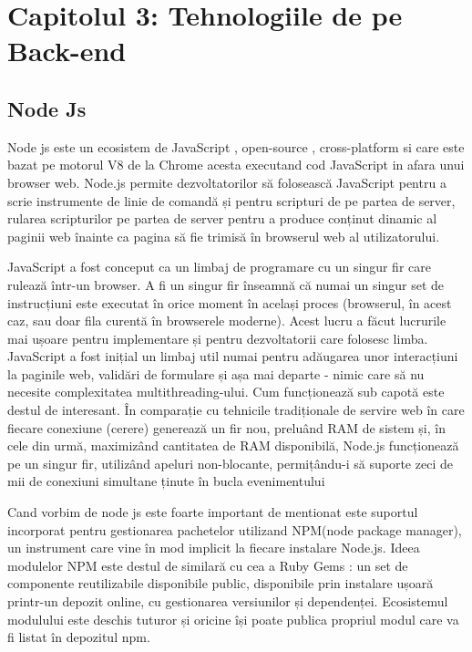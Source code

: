 \chapter{Capitolul 3: Tehnologiile de pe Back-end}
\label{chap:ch3}

\section{Node Js}
\label{sec:ch3sec1}

\par Node js este un ecosistem de JavaScript , open-source , cross-platform si care este bazat pe motorul V8 de la Chrome acesta executand cod JavaScript in afara unui browser web. Node.js permite dezvoltatorilor să folosească JavaScript pentru a scrie instrumente de linie de comandă și pentru scripturi de pe partea de server, rularea scripturilor pe partea de server pentru a produce conținut dinamic al paginii web înainte ca pagina să fie trimisă în browserul web al utilizatorului.
\par JavaScript a fost conceput ca un limbaj de programare cu un singur fir care rulează într-un browser. A fi un singur fir înseamnă că numai un singur set de instrucțiuni este executat în orice moment în același proces (browserul, în acest caz, sau doar fila curentă în browserele moderne).
Acest lucru a făcut lucrurile mai ușoare pentru implementare și pentru dezvoltatorii care folosesc limba. JavaScript a fost inițial un limbaj util numai pentru adăugarea unor interacțiuni la paginile web, validări de formulare și așa mai departe - nimic care să nu necesite complexitatea multithreading-ului.
Cum funcționează sub capotă este destul de interesant. În comparație cu tehnicile tradiționale de servire web în care fiecare conexiune (cerere) generează un fir nou, preluând RAM de sistem și, în cele din urmă, maximizând cantitatea de RAM disponibilă, Node.js funcționează pe un singur fir, utilizând  apeluri non-blocante, permițându-i să suporte zeci de mii de conexiuni simultane ținute în bucla evenimentului
\par Cand vorbim de node js este foarte important de mentionat este suportul incorporat pentru gestionarea pachetelor utilizand NPM(node package manager), un instrument care vine în mod implicit la fiecare instalare Node.js. Ideea modulelor NPM este destul de similară cu cea a Ruby Gems : un set de componente reutilizabile disponibile public, disponibile prin instalare ușoară printr-un depozit online, cu gestionarea versiunilor și dependenței. Ecosistemul modulului este deschis tuturor și oricine își poate publica propriul modul care va fi listat în depozitul npm.

